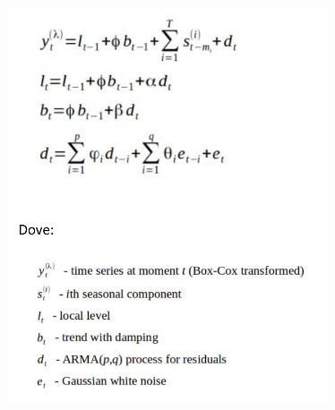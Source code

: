 \documentclass[12pt, a4paper, twocolumn]{article} %
\begin{document}
\begin{figure}
  \caption{\protect\cite{tbats}}
  \begin{center}
    \includegraphics{tbats2.png}
  \end{center}
\end{figure}
\end{document}
